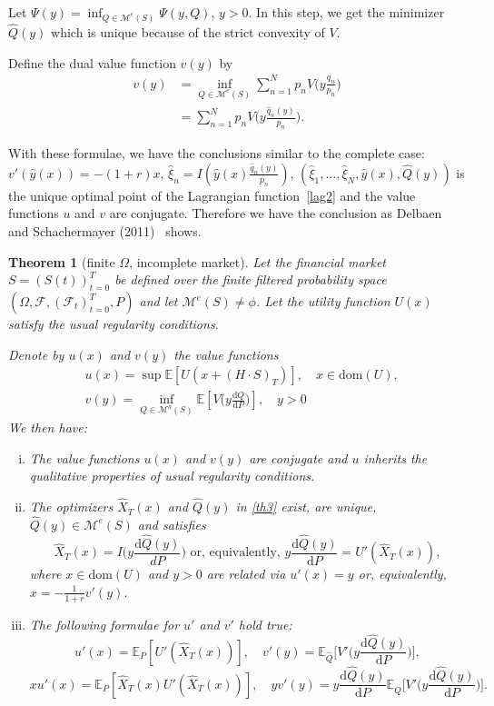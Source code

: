 \documentclass[a4paper]{article}
\newtheorem{theorem}{Theorem}[section]
\theoremstyle{definition}
\numberwithin{equation}{section}
\begin{document}
Let $\Psi(y)=\inf_{Q\in\mathcal M^e(S)}\Psi(y,Q)$, $y>0$. In this step, we get the minimizer $\hat Q(y)$ which is unique because of the strict convexity of $V$.

Define the dual value function $v(y)$ by
\begin{equation}
\begin{aligned}
v(y)&=\inf_{Q\in\mathcal M^e(S)}\sum^N_{n=1}p_nV\big(y\frac{q_n}{p_n}\big)\\
&=\sum^N_{n=1}p_nV\big(y\frac{\hat q_n(y)}{p_n}\big).
\end{aligned}
\end{equation}

With these formulae, we have the conclusions similar to the complete case:
$v'(\hat y(x))=-(1+r)x$, $\hat\xi_n=I(\hat y(x)\frac{\hat q_n(y)}{p_n})$, $(\hat\xi_1,\dots,\hat\xi_N,\hat y(x),\hat Q(y))$ is the unique optimal point of the Lagrangian function~\eqref{lag2} and the value functions $u$ and $v$ are conjugate. Therefore we have the conclusion as Delbaen and Schachermayer (2011)~\cite{book1} shows.

\begin{theorem}[finite $\Omega$, incomplete market]\label{incomp}
Let the financial market $S=(S(t))^T_{t=0}$ be defined over the finite filtered probability space $(\Omega,\mathcal F,(\mathcal F_t)^T_{t=0},P)$ and let $\mathcal M^e(S)\neq\phi$. Let the utility function $U(x)$ satisfy the usual regularity conditions.

Denote by $u(x)$ and $v(y)$ the value functions
\begin{equation}\label{th3}
\begin{aligned}
&u(x)=\sup\mathbb E[U(x+(H\cdot S)_T)],\quad x\in\text{dom}(U),
\\
&v(y)=\inf_{Q\in\mathcal M^a(S)}\mathbb E[V\Big(y\frac{\mathrm dQ}{\mathrm dP}\Big)],\quad y>0
\end{aligned}
\end{equation}
We then have:
\begin{enumerate}[(i)]
\item
The value functions $u(x)$ and $v(y)$ are conjugate and $u$ inherits the qualitative properties of usual regularity conditions.
\item
The optimizers $\hat X_T(x)$ and $\hat Q(y)$ in \eqref{th3} exist, are unique, $\hat Q(y)\in\mathcal M^e(S)$ and satisfies
$$\hat X_T(x)=I\Big(y\frac{\mathrm d\hat Q(y)}{dP}\Big)\text{ or, equivalently, }y\frac{\mathrm d\hat Q(y)}{\mathrm dP}=U'(\hat X_T(x)),$$
where $x\in\mathrm{dom}(U)$ and $y>0$ are related via $u'(x)=y$ or, equivalently, $x=-\frac{1}{1+r}v'(y)$.
\item
The following formulae for $u'$ and $v'$ hold true:
$$u'(x)=\mathbb E_P[U'(\hat X_T(x))],\quad v'(y)=\mathbb E_{\hat Q}\Big[V'\Big(y\frac{\mathrm d\hat Q(y)}{\mathrm dP}\Big)\Big],$$
$$xu'(x)=\mathbb E_P[\hat X_T(x)U'(\hat X_T(x))],\quad yv'(y)=y\frac{\mathrm d\hat Q(y)}{\mathrm dP}\mathbb E_{\hat Q}\Big[V'\Big(y\frac{\mathrm d\hat Q(y)}{\mathrm dP}\Big)\Big].$$
\end{enumerate}
\end{theorem}
\end{document}
